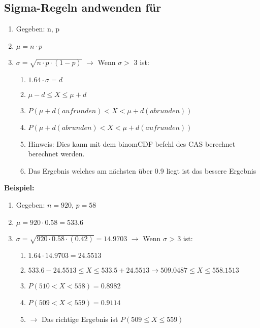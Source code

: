 	\subsection{Sigma-Regeln andwenden für }
		\begin{enumerate}
			\item Gegeben: n, p
			\item $ \mu = n \cdot p$
			\item $\sigma = \sqrt{n \cdot p \cdot (1-p)}$ $\rightarrow$ Wenn $\sigma >$ 3 ist:
			\begin{enumerate}
				\item $1.64 \cdot \sigma = d$
				\item $\mu -d \leq X \leq \mu + d$
				\item $P(\mu + d (aufrunden) < X <\mu + d (abrunden))$
				\item $P(\mu + d (abrunden) < X <\mu + d (aufrunden))$
				\item Hinweis: Dies kann mit dem binomCDF befehl des CAS berechnet berechnet werden.
				\item Das Ergebnis welches am nächsten über 0.9 liegt ist das bessere Ergebnis
			\end{enumerate}
		\end{enumerate}
	\textbf{Beispiel:}
	\begin{enumerate}
			\item Gegeben: $n = 920$,  $p = 58$
			\item $ \mu = 920 \cdot 0.58 = 533.6$
			\item $\sigma = \sqrt{920 \cdot 0.58 \cdot (0.42)} = 14.9703$ $\rightarrow$ Wenn $\sigma$ > 3 ist:
			\begin{enumerate}
				\item $1.64 \cdot 14.9703 = 24.5513$
				\item $533.6 - 24.5513 \leq X \leq 533.5 + 24.5513 \rightarrow 509.0487 \leq X \leq 558.1513$
				\item $P(510 < X < 558) = 0.8982$
				\item $P(509 < X <559) = 0.9114$
				\item $\rightarrow$ Das richtige Ergebnis ist $P(509 \leq X \leq 559)$
			\end{enumerate}
		\end{enumerate}